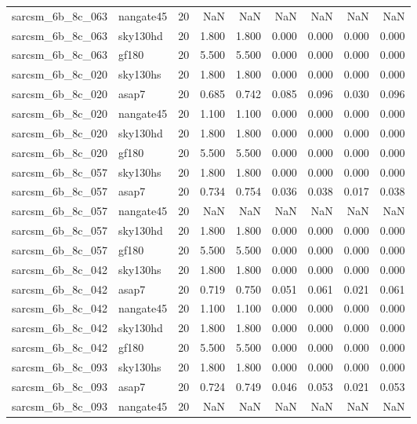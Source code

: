 \begin{tabular}{llrrrrrrr}
sarcsm\_6b\_8c\_063 & nangate45 & 20 & NaN & NaN & NaN & NaN & NaN & NaN \\
sarcsm\_6b\_8c\_063 & sky130hd & 20 & 1.800 & 1.800 & 0.000 & 0.000 & 0.000 & 0.000 \\
sarcsm\_6b\_8c\_063 & gf180 & 20 & 5.500 & 5.500 & 0.000 & 0.000 & 0.000 & 0.000 \\
sarcsm\_6b\_8c\_020 & sky130hs & 20 & 1.800 & 1.800 & 0.000 & 0.000 & 0.000 & 0.000 \\
sarcsm\_6b\_8c\_020 & asap7 & 20 & 0.685 & 0.742 & 0.085 & 0.096 & 0.030 & 0.096 \\
sarcsm\_6b\_8c\_020 & nangate45 & 20 & 1.100 & 1.100 & 0.000 & 0.000 & 0.000 & 0.000 \\
sarcsm\_6b\_8c\_020 & sky130hd & 20 & 1.800 & 1.800 & 0.000 & 0.000 & 0.000 & 0.000 \\
sarcsm\_6b\_8c\_020 & gf180 & 20 & 5.500 & 5.500 & 0.000 & 0.000 & 0.000 & 0.000 \\
sarcsm\_6b\_8c\_057 & sky130hs & 20 & 1.800 & 1.800 & 0.000 & 0.000 & 0.000 & 0.000 \\
sarcsm\_6b\_8c\_057 & asap7 & 20 & 0.734 & 0.754 & 0.036 & 0.038 & 0.017 & 0.038 \\
sarcsm\_6b\_8c\_057 & nangate45 & 20 & NaN & NaN & NaN & NaN & NaN & NaN \\
sarcsm\_6b\_8c\_057 & sky130hd & 20 & 1.800 & 1.800 & 0.000 & 0.000 & 0.000 & 0.000 \\
sarcsm\_6b\_8c\_057 & gf180 & 20 & 5.500 & 5.500 & 0.000 & 0.000 & 0.000 & 0.000 \\
sarcsm\_6b\_8c\_042 & sky130hs & 20 & 1.800 & 1.800 & 0.000 & 0.000 & 0.000 & 0.000 \\
sarcsm\_6b\_8c\_042 & asap7 & 20 & 0.719 & 0.750 & 0.051 & 0.061 & 0.021 & 0.061 \\
sarcsm\_6b\_8c\_042 & nangate45 & 20 & 1.100 & 1.100 & 0.000 & 0.000 & 0.000 & 0.000 \\
sarcsm\_6b\_8c\_042 & sky130hd & 20 & 1.800 & 1.800 & 0.000 & 0.000 & 0.000 & 0.000 \\
sarcsm\_6b\_8c\_042 & gf180 & 20 & 5.500 & 5.500 & 0.000 & 0.000 & 0.000 & 0.000 \\
sarcsm\_6b\_8c\_093 & sky130hs & 20 & 1.800 & 1.800 & 0.000 & 0.000 & 0.000 & 0.000 \\
sarcsm\_6b\_8c\_093 & asap7 & 20 & 0.724 & 0.749 & 0.046 & 0.053 & 0.021 & 0.053 \\
sarcsm\_6b\_8c\_093 & nangate45 & 20 & NaN & NaN & NaN & NaN & NaN & NaN \\

\end{tabular}
